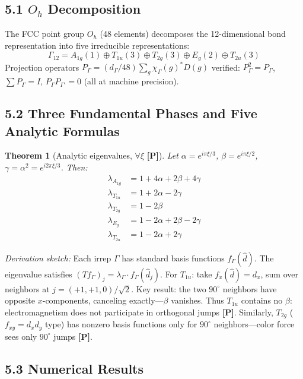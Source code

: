 \documentclass[11pt,a4paper]{article}
\newtheorem{theorem}{Theorem}[section]
\newcommand{\gradeP}{\textbf{[P]}}
\begin{document}
\subsection{5.1 $O_h$ Decomposition}

The FCC point group $O_h$ (48 elements) decomposes the 12-dimensional bond representation into five irreducible representations:
\[
\Gamma_{12} = A_{1g}(1)\oplus T_{1u}(3)\oplus T_{2g}(3)\oplus E_g(2)\oplus T_{2u}(3)
\]
Projection operators $P_\Gamma = (d_\Gamma/48)\sum_g \chi_\Gamma(g)^* D(g)$ verified: $P_\Gamma^2 = P_\Gamma$, $\sum P_\Gamma = I$, $P_\Gamma P_{\Gamma'}=0$ (all at machine precision).

\subsection{5.2 Three Fundamental Phases and Five Analytic Formulas}

\begin{theorem}[Analytic eigenvalues, $\forall\xi$ \gradeP]\label{thm:eigenvalues}
Let $\alpha = e^{i\pi\xi/3}$, $\beta = e^{i\pi\xi/2}$, $\gamma = \alpha^2 = e^{i2\pi\xi/3}$. Then:
\begin{align}
\lambda_{A_{1g}} &= 1 + 4\alpha + 2\beta + 4\gamma \label{eq:A1g}\\
\lambda_{T_{1u}} &= 1 + 2\alpha - 2\gamma \label{eq:T1u}\\
\lambda_{T_{2g}} &= 1 - 2\beta \label{eq:T2g}\\
\lambda_{E_g} &= 1 - 2\alpha + 2\beta - 2\gamma \label{eq:Eg}\\
\lambda_{T_{2u}} &= 1 - 2\alpha + 2\gamma \label{eq:T2u}
\end{align}
\end{theorem}

\emph{Derivation sketch:} Each irrep $\Gamma$ has standard basis functions $f_\Gamma(\hat{d})$. The eigenvalue satisfies $(Tf_\Gamma)_j = \lambda_\Gamma\cdot f_\Gamma(\hat{d}_j)$. For $T_{1u}$: take $f_x(\hat{d})=d_x$, sum over neighbors at $j=(+1,+1,0)/\sqrt{2}$. Key result: the two $90^\circ$ neighbors have opposite $x$-components, canceling exactly---$\beta$ vanishes. Thus $T_{1u}$ contains no $\beta$: electromagnetism does not participate in orthogonal jumps \gradeP. Similarly, $T_{2g}$ ($f_{xy}=d_x d_y$ type) has nonzero basis functions only for $90^\circ$ neighbors---color force sees only $90^\circ$ jumps \gradeP.

\subsection{5.3 Numerical Results}
\end{document}
